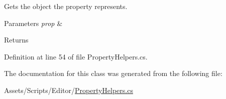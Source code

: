 Gets the object the property represents. 


\begin{DoxyParams}{Parameters}
{\em prop} & \\
\hline
\end{DoxyParams}
\begin{DoxyReturn}{Returns}

\end{DoxyReturn}


Definition at line 54 of file Property\+Helpers.\+cs.



The documentation for this class was generated from the following file\+:\begin{DoxyCompactItemize}
\item 
Assets/\+Scripts/\+Editor/\mbox{\hyperlink{_property_helpers_8cs}{Property\+Helpers.\+cs}}\end{DoxyCompactItemize}
